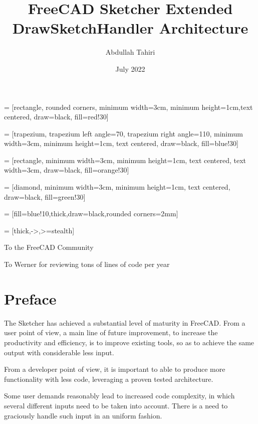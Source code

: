\documentclass[12pt,twoside,a4paper]{book}
\title{FreeCAD Sketcher Extended DrawSketchHandler Architecture}
\author{Abdullah Tahiri}
\date{July 2022}
\newenvironment{dedication}
  {\clearpage           %
   \thispagestyle{empty}%
   \vspace*{\stretch{1}}%
   \itshape             %
   \raggedleft          %
  }
  {\par %
   \vspace{\stretch{3}} %
   \clearpage           %
  }
\begin{document}
     = [rectangle, rounded corners, minimum width=3cm, minimum height=1cm,text centered, draw=black, fill=red!30]

     = [trapezium, trapezium left angle=70, trapezium right angle=110, minimum width=3cm, minimum height=1cm, text centered, draw=black, fill=blue!30]


     = [rectangle, minimum width=3cm, minimum height=1cm, text centered, text width=3cm, draw=black, fill=orange!30]

     = [diamond, minimum width=3cm, minimum height=1cm, text centered, draw=black, fill=green!30]

     = [fill=blue!10,thick,draw=black,rounded corners=2mm]

     = [thick,->,>=stealth]

    \frontmatter

    \maketitle

    \begin{dedication}
        To the FreeCAD Community
        \par   %
        \vspace{2\baselineskip}
        To Werner for reviewing tons of lines of code per year
    \end{dedication}


    \chapter{Preface}

    The Sketcher has achieved a substantial level of maturity in FreeCAD. From a user point of view, a main line of future improvement, to increase the productivity and efficiency, is to improve existing tools, so as to achieve the same output with considerable less input.

    From a developer point of view, it is important to able to produce more functionality with less code, leveraging a proven tested architecture.

    Some user demands reasonably lead to increased code complexity, in which several different inputs need to be taken into account. There is a need to graciously handle such input in an uniform fashion.
\end{document}
